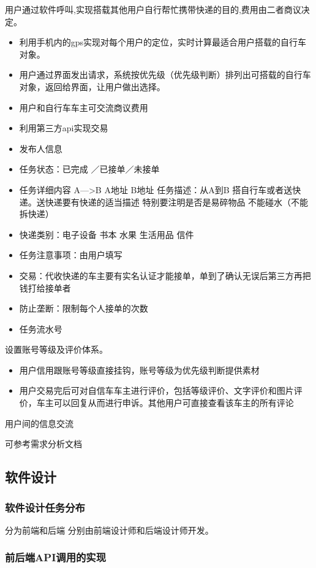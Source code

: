 \documentclass[UTF8]{dingo}
\begin{document}
      用户通过软件呼叫,实现搭载其他用户自行帮忙携带快递的目的,费用由二者商议决定。
      \begin{itemize}
        \item 利用手机内的gps实现对每个用户的定位，实时计算最适合用户搭载的自行车对象。
        \item 用户通过界面发出请求，系统按优先级（优先级判断）排列出可搭载的自行车对象，返回给界面，让用户做出选择。
        \item 用户和自行车车主可交流商议费用
        \item 利用第三方api实现交易
        \item 发布人信息
        \item 任务状态：已完成 ／已接单／未接单
        \item 任务详细内容 A—>B A地址 B地址 任务描述：从A到B 搭自行车或者送快递。送快递要有快递的适当描述 特别要注明是否是易碎物品 不能碰水（不能拆快递）
        \item 快递类别：电子设备 书本 水果 生活用品 信件
        \item 任务注意事项：由用户填写
        \item 交易：代收快递的车主要有实名认证才能接单，单到了确认无误后第三方再把钱打给接单者
        \item 防止垄断：限制每个人接单的次数
        \item 任务流水号
      \end{itemize}

      设置账号等级及评价体系。
      \begin{itemize}
        \item 用户信用跟账号等级直接挂钩，账号等级为优先级判断提供素材
        \item 用户交易完后可对自信车车主进行评价，包括等级评价、文字评价和图片评价，车主可以回复从而进行申诉。其他用户可直接查看该车主的所有评论
      \end{itemize}

      用户间的信息交流

      可参考需求分析文档
    \subsection{软件设计}
      \subsubsection{软件设计任务分布}
        分为前端和后端 分别由前端设计师和后端设计师开发。
      \subsubsection{前后端API调用的实现}
\end{document}
